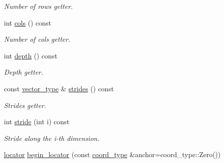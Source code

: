\begin{DoxyCompactItemize}
\begin{DoxyCompactList}\small\item\em Number of rows getter. \end{DoxyCompactList}\item 
\hypertarget{class_d_o_1_1_multi_array_a3cefa469a7524d4bbc80531ebb9b5df4}{int \hyperlink{class_d_o_1_1_multi_array_a3cefa469a7524d4bbc80531ebb9b5df4}{cols} () const }\label{class_d_o_1_1_multi_array_a3cefa469a7524d4bbc80531ebb9b5df4}

\begin{DoxyCompactList}\small\item\em Number of cols getter. \end{DoxyCompactList}\item 
\hypertarget{class_d_o_1_1_multi_array_a3275d1392d01b26af1c8cd52b0d10745}{int \hyperlink{class_d_o_1_1_multi_array_a3275d1392d01b26af1c8cd52b0d10745}{depth} () const }\label{class_d_o_1_1_multi_array_a3275d1392d01b26af1c8cd52b0d10745}

\begin{DoxyCompactList}\small\item\em Depth getter. \end{DoxyCompactList}\item 
\hypertarget{class_d_o_1_1_multi_array_a5be6b48ede748b588c237552cbf3b6b8}{const \hyperlink{class_d_o_1_1_multi_array_aacf98e49e90f9aeead0ff8885fae3ac7}{vector\-\_\-type} \& \hyperlink{class_d_o_1_1_multi_array_a5be6b48ede748b588c237552cbf3b6b8}{strides} () const }\label{class_d_o_1_1_multi_array_a5be6b48ede748b588c237552cbf3b6b8}

\begin{DoxyCompactList}\small\item\em Strides getter. \end{DoxyCompactList}\item 
\hypertarget{class_d_o_1_1_multi_array_abe61dbf6dda369f1605c7700793791bd}{int \hyperlink{class_d_o_1_1_multi_array_abe61dbf6dda369f1605c7700793791bd}{stride} (int i) const }\label{class_d_o_1_1_multi_array_abe61dbf6dda369f1605c7700793791bd}

\begin{DoxyCompactList}\small\item\em Stride along the i-\/th dimension. \end{DoxyCompactList}\item 
\hypertarget{class_d_o_1_1_multi_array_a09652d290e05eb96dcfb1db912ec8fb2}{\hyperlink{class_d_o_1_1_multi_array_ad121376b4c75b70d8dbbf614aa8c238a}{locator} \hyperlink{class_d_o_1_1_multi_array_a09652d290e05eb96dcfb1db912ec8fb2}{begin\-\_\-locator} (const \hyperlink{class_d_o_1_1_multi_array_ae4fb477425bbeb20329d300396ac2582}{coord\-\_\-type} \&anchor=coord\-\_\-type\-::\-Zero())}\label{class_d_o_1_1_multi_array_a09652d290e05eb96dcfb1db912ec8fb2}


\end{DoxyCompactItemize}
